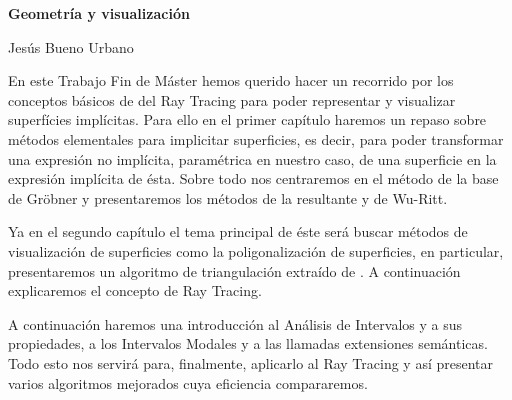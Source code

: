 

%



\cleardoublepage
\thispagestyle{empty}

\begin{center}
{\large\bfseries Geometría y visualización}\\
\end{center}
\begin{center}
Jesús Bueno Urbano\\
\end{center}


\vspace{0.7cm}

En este Trabajo Fin de Máster hemos querido hacer un recorrido por los conceptos básicos de del Ray Tracing para poder representar y visualizar superfícies implícitas. Para ello en el  primer capítulo haremos un repaso sobre métodos elementales para implicitar superficies, es decir, para poder transformar una expresión no implícita, paramétrica en nuestro caso, de una superficie en la expresión implícita de ésta. Sobre todo nos centraremos en el método de la base de Gröbner y presentaremos los métodos de la resultante y de Wu-Ritt.

Ya en el segundo capítulo el tema principal de éste será buscar métodos de visualización de superficies como la poligonalización de superficies, en particular, presentaremos un algoritmo de triangulación extraído de \cite{Hartmann03}. A continuación explicaremos el concepto de Ray Tracing.

A continuación haremos una introducción al Análisis de Intervalos y a sus propiedades, a los Intervalos Modales y a las llamadas extensiones semánticas. Todo esto nos servirá para, finalmente, aplicarlo al Ray Tracing y así presentar varios algoritmos mejorados cuya eficiencia compararemos.
\cleardoublepage





